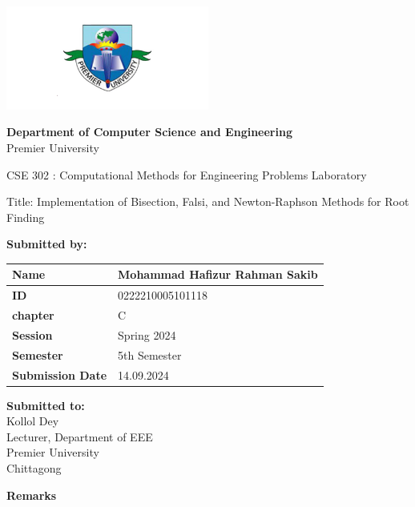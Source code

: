 \documentclass{scrreprt}
\renewcommand{\arraystretch}{1.5}
\begin{document}
\begin{titlepage}
    \centering
    \includegraphics[width=0.5\textwidth]{./logo.png} 
    \vspace{1cm}

    \textbf{Department of Computer Science and Engineering}\\
    Premier University
    \vspace{1cm}

     \large \textnormal{CSE 302 : Computational Methods for Engineering 
    Problems Laboratory }
    \vspace{1in} 

    \Large \textnormal{Title: Implementation of Bisection, Falsi, and Newton-Raphson Methods for Root Finding}
    \vspace{0.5in} 

    \large
    \textbf{Submitted by:}
    \vspace{0.5cm}

    \renewcommand{\arraystretch}{1.5} 
    \begin{tabular}{|p{}|p{}|}
        \hline
        \textbf{Name} & Mohammad Hafizur Rahman Sakib \\ 
        \hline
        \textbf{ID} & 0222210005101118 \\ 
        \hline
        \textbf{chapter} & C \\ 
        \hline
        \textbf{Session} & Spring 2024 \\ 
        \hline
        \textbf{Semester} & 5th Semester \\ 
        \hline
        \textbf{Submission Date} & 14.09.2024 \\ 
        \hline
    \end{tabular}
    \vspace{1cm}

    \begin{minipage}[t]{0.48\textwidth}
        \textbf{Submitted to:}\\
        Kollol Dey\\
        Lecturer, Department of EEE\\
        Premier University\\
        Chittagong
    \end{minipage}%
    \hfill 
    \begin{minipage}[t]{0.48\textwidth}
        \raggedleft
        \textbf{Remarks}\\
        \vspace{0.5cm} %
    \end{minipage}


\end{titlepage}
\end{document}
